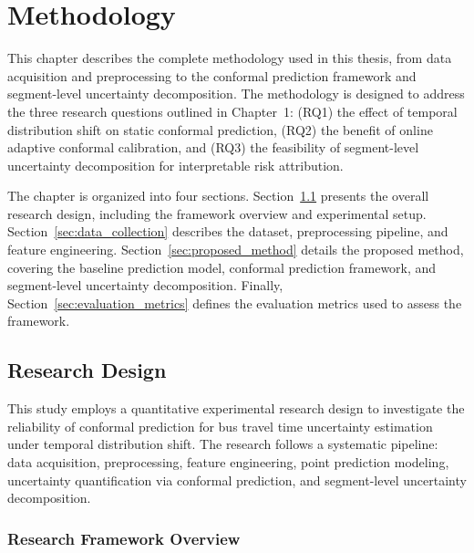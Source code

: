 
\chapter{Methodology}
\label{ch:methodology}

This chapter describes the complete methodology used in this thesis, from data acquisition and preprocessing to the conformal prediction framework and segment-level uncertainty decomposition. The methodology is designed to address the three research questions outlined in Chapter~1: (RQ1) the effect of temporal distribution shift on static conformal prediction, (RQ2) the benefit of online adaptive conformal calibration, and (RQ3) the feasibility of segment-level uncertainty decomposition for interpretable risk attribution.

The chapter is organized into four sections. Section~\ref{sec:research_design} presents the overall research design, including the framework overview and experimental setup. Section~\ref{sec:data_collection} describes the dataset, preprocessing pipeline, and feature engineering. Section~\ref{sec:proposed_method} details the proposed method, covering the baseline prediction model, conformal prediction framework, and segment-level uncertainty decomposition. Finally, Section~\ref{sec:evaluation_metrics} defines the evaluation metrics used to assess the framework.


\section{Research Design}
\label{sec:research_design}

This study employs a quantitative experimental research design to investigate the reliability of conformal prediction for bus travel time uncertainty estimation under temporal distribution shift. The research follows a systematic pipeline: data acquisition, preprocessing, feature engineering, point prediction modeling, uncertainty quantification via conformal prediction, and segment-level uncertainty decomposition.

\subsection{Research Framework Overview}
\label{subsec:framework_overview}


